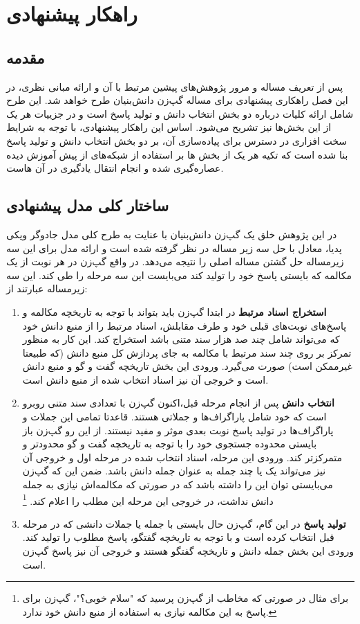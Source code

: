 \chapter{راهکار پیشنهادی}\label{chap4}
\minitoc


\section{مقدمه}
پس از تعریف مساله و مرور پژوهش‌های پیشین مرتبط با آن و ارائه مبانی نظری، در این  فصل راهکاری پیشنهادی برای مساله گپ‌زن دانش‌بنیان طرح خواهد شد. این طرح شامل ارائه کلیات درباره دو بخش انتخاب دانش و تولید پاسخ است و در جزییات هر یک از این بخش‌ها نیز تشریح می‌شود. اساس این راهکار پیشنهادی، با توجه به شرایط سخت افزاری در دسترس برای پیاده‌سازی آن، بر دو بخش انتخاب دانش و تولید پاسخ بنا شده است که تکیه هر یک از بخش ‌ها بر استفاده از شبکه‌های از پیش آموزش دیده عصاره‌گیری شده و انجام انتقال یادگیری در آن هاست.


\section{ساختار کلی مدل پیشنهادی}
در این پژوهش خلق یک گپ‌زن دانش‌بنیان 
با عنایت به طرح کلی مدل جادوگر ویکی پدیا،
معادل با حل سه زیر مساله در نظر گرفته شده است و ارائه مدل برای این سه زیرمساله حل گشتن مساله اصلی را نتیجه می‌دهد. در واقع گپ‌زن در هر نوبت از یک مکالمه که بایستی پاسخ خود را تولید کند می‌بایست این سه مرحله را طی کند. این سه زیرمساله عبارتند از:

\begin{enumerate}
	\item 
	\textbf{استخراج اسناد مرتبط}
	در ابتدا گپ‌زن باید بتواند با توجه به تاریخچه مکالمه و پاسخ‌های نوبت‌های قبلی خود و طرف مقابلش، اسناد مرتبط را از منبع دانش خود که می‌تواند شامل چند صد هزار سند متنی باشد استخراج کند. این کار به منظور تمرکز بر روی چند سند مرتبط با مکالمه به جای پردازش کل منبع دانش (که طبیعتا غیرممکن است) صورت می‌گیرد. ورودی این بخش تاریخچه گفت‌ و گو و منبع دانش است و خروجی آن نیز اسناد انتخاب شده از منبع دانش است. 
	\item 
	\textbf{انتخاب دانش}
	پس از انجام مرحله قبل،‌اکنون گپ‌زن با تعدادی سند متنی روبرو است که خود شامل پاراگراف‌ها و جملاتی هستند. قاعدتا تمامی این جملات و پاراگراف‌ها در تولید پاسخ نوبت‌ بعدی موثر و مفید نیستند. از این رو گپ‌زن باز بایستی محدوده جستجوی خود را
	با توجه به تاریخچه گفت و گو محدودتر و متمرکزتر کند. 
	ورودی این مرحله، اسناد انتخاب شده در مرحله اول و خروجی آن نیز می‌تواند یک یا چند جمله 
	به عنوان جمله دانش باشد. ضمن این که گپ‌زن می‌بایستی توان این را داشته باشد که در صورتی که مکالمه‌اش نیازی به جمله دانش نداشت، در خروجی این مرحله این مطلب را اعلام کند. 
\footnote{برای مثال در صورتی که مخاطب از گپ‌زن پرسید که "سلام خوبی؟"، گپ‌زن برای پاسخ به این مکالمه نیازی به استفاده از منبع دانش خود ندارد.}
	\item
	\textbf{تولید پاسخ}
	در این گام، گپ‌زن حال بایستی با جمله یا جملات دانشی که در مرحله قبل انتخاب کرده است و با توجه به تاریخچه گفتگو، پاسخ مطلوب را تولید کند. ورودی این بخش جمله دانش و تاریخچه گفتگو هستند و خروجی آن نیز پاسخ گپ‌زن است. 
	
	
\end{enumerate}

